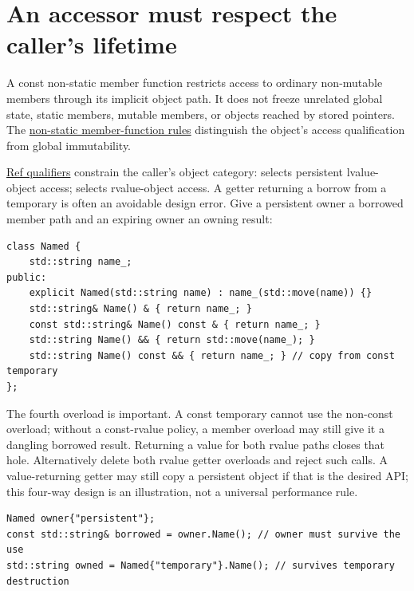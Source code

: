 \section{An accessor must respect the caller's lifetime}\label{01-foundations-i-ch003-an-accessor-must-respect-the-callers-lifetime}

\hypertarget{01-foundations-i-ch003-an-accessor-must-respect-the-callers-lifetime}{}

A const non-static member function restricts access to ordinary non-mutable members through its implicit object path. It does not freeze unrelated global state, static members, mutable members, or objects reached by stored pointers. The \href{https://eel.is/c++draft/class.mfct.non.static}{non-static member-function rules} distinguish the object's access qualification from global immutability.

\hyperref[appendix-d42039b1d6f7]{Ref qualifiers} constrain the caller's object category: \BookInlineCode{\&} selects persistent lvalue-object access; \BookInlineCode{\&\&} selects rvalue-object access. A getter returning a borrow from a temporary is often an avoidable design error. Give a persistent owner a borrowed member path and an expiring owner an owning result:

\begin{verbatim}
class Named {
    std::string name_;
public:
    explicit Named(std::string name) : name_(std::move(name)) {}
    std::string& Name() & { return name_; }
    const std::string& Name() const & { return name_; }
    std::string Name() && { return std::move(name_); }
    std::string Name() const && { return name_; } // copy from const temporary
};
\end{verbatim}

The fourth overload is important. A const temporary cannot use the non-const \BookInlineCode{\&\&} overload; without a const-rvalue policy, a  member overload may still give it a dangling borrowed result. Returning a value for both rvalue paths closes that hole. Alternatively delete both rvalue getter overloads and reject such calls. A value-returning getter may still copy a persistent object if that is the desired API; this four-way design is an illustration, not a universal performance rule.

\begin{verbatim}
Named owner{"persistent"};
const std::string& borrowed = owner.Name(); // owner must survive the use
std::string owned = Named{"temporary"}.Name(); // survives temporary destruction
\end{verbatim}

